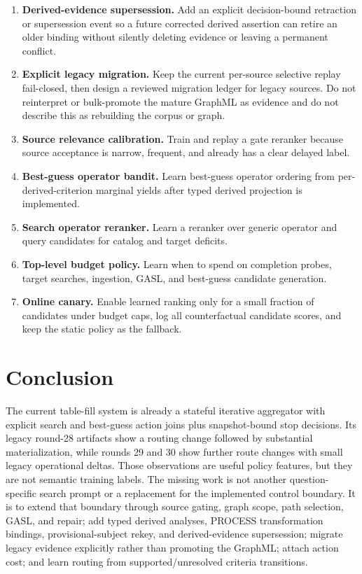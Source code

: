 \documentclass[11pt]{article}
\begin{document}
\begin{enumerate}
  typed rekey transition before a derived value may create or correct a subject
  identity.
  \item \textbf{Derived-evidence supersession.}  Add an explicit decision-bound
  retraction or supersession event so a future corrected derived assertion can
  retire an older binding without silently deleting evidence or leaving a
  permanent conflict.
  \item \textbf{Explicit legacy migration.}  Keep the current per-source
  selective replay fail-closed, then design a reviewed migration ledger for
  legacy sources.  Do not reinterpret or bulk-promote the mature GraphML as
  evidence and do not describe this as rebuilding the corpus or graph.
  \item \textbf{Source relevance calibration.}  Train and replay a gate
  reranker because source acceptance is narrow, frequent, and already has a
  clear delayed label.
  \item \textbf{Best-guess operator bandit.}  Learn best-guess operator ordering
  from per-derived-criterion marginal yields after typed derived projection is
  implemented.
  \item \textbf{Search operator reranker.}  Learn a reranker over generic
  operator and query candidates for catalog and target deficits.
  \item \textbf{Top-level budget policy.}  Learn when to spend on completion
  probes, target searches, ingestion, GASL, and best-guess candidate
  generation.
  \item \textbf{Online canary.}  Enable learned ranking only for a small
  fraction of candidates under budget caps, log all counterfactual candidate
  scores, and keep the static policy as the fallback.
\end{enumerate}

\section{Conclusion}

The current table-fill system is already a stateful iterative aggregator with
explicit search and best-guess action joins plus snapshot-bound stop decisions.
Its legacy round-28 artifacts show a routing change followed by substantial
materialization, while rounds 29 and 30 show further route changes with small
legacy operational deltas.  Those observations are useful policy features, but
they are not semantic training labels.  The missing work is not another
question-specific search prompt or a replacement for the implemented control
boundary.  It is to extend that boundary through source gating, graph scope,
path selection, GASL, and repair; add typed derived analyses, PROCESS
transformation bindings, provisional-subject rekey, and derived-evidence
supersession; migrate legacy evidence explicitly rather than promoting the
GraphML; attach action cost; and learn routing from supported/unresolved
criteria transitions.
\end{document}
